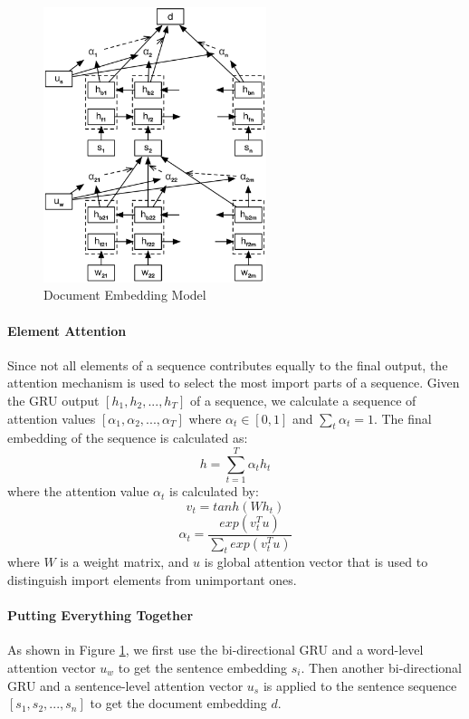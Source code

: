 \begin{figure}[htbp]
\begin{center}
\includegraphics[width=6.5cm]{figures/HAN.png}	
\caption{Document Embedding Model}
\label{doc_embed}
\end{center}
\end{figure}

\paragraph{Element Attention}
Since not all elements of a sequence contributes equally to the final output, the attention mechanism is used to select the most import parts of a sequence. Given the GRU output $[h_1, h_2, ..., h_T]$ of a sequence, we calculate a sequence of attention values $[\alpha_1, \alpha_2, ..., \alpha_T]$ where $\alpha_t \in [0, 1]$ and $\sum_t{\alpha_t}=1$. The final embedding of the sequence is calculated as:
\begin{equation}
h = \sum_{t=1}^{T}{\alpha_t h_t}
\label{seq_embed}
\end{equation}
where the attention value $\alpha_t$ is calculated by:
\begin{equation}
v_t = tanh(Wh_t)
\label{eq_att_transform}
\end{equation}
\begin{equation}
\alpha_t=\frac{exp(v_t^T u)}{\sum_t{exp(v_t^T u)}}
\label{gen_att}
\end{equation}
where $W$ is a weight matrix, and $u$ is global attention vector that is used to distinguish import elements from unimportant ones. 

\paragraph{Putting Everything Together}
As shown in Figure \ref{doc_embed}, we first use the bi-directional GRU and a word-level attention vector $u_w$ to get the sentence embedding $s_i$. Then another bi-directional GRU and a sentence-level attention vector $u_s$ is applied to the sentence sequence $[s_1, s_2, ..., s_n]$ to get the document embedding $d$.

